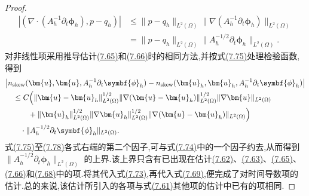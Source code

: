 \begin{proof}
\begin{equation}
\begin{aligned}
  |(\nabla\cdot(A_h^{-1}\partial_t\symbf{\phi}_h),p-q_h)|
  &\le \|p-q_h\|_{L^2(\Omega)}
       \|\nabla(A_h^{-1}\partial_t\symbf{\phi}_h)\|_{L^2(\Omega)}\\
  &=\|p-q_h\|_{L^2(\Omega)}
       \|A_h^{-1/2}\partial_t\symbf{\phi}_h\|_{L^2(\Omega)}.
\end{aligned}
\end{equation}
对非线性项采用推导估计\hyperref[eq:time-dependent-pressure-error-convection-bound-1]{(7.65)}和\hyperref[eq:time-dependent-pressure-error-convection-bound-2]{(7.66)}时的相同方法,并按式\hyperref[eq:time-dependent-pressure-error-time-derivative-projection-test]{(7.75)}处理检验函数,得到
\begin{equation}\label{eq:time-dependent-pressure-error-convection-test}
\begin{aligned}
  &\bigl|n_{\mathrm{skew}}(\bm{u},\bm{u},
       A_h^{-1}\partial_t\symbf{\phi}_h)
       -n_{\mathrm{skew}}(\bm{u}_h,\bm{u}_h,
       A_h^{-1}\partial_t\symbf{\phi}_h)\bigr|\\
  &\quad\le C\Bigl(
       \|\bm{u}-\bm{u}_h\|_{L^2(\Omega)}^{1/2}
       \|\nabla(\bm{u}-\bm{u}_h)\|_{L^2(\Omega)}^{1/2}
       \|\nabla\bm{u}\|_{L^2(\Omega)}\\
  &\qquad\quad+
       \|\bm{u}_h\|_{L^2(\Omega)}^{1/2}
       \|\nabla\bm{u}_h\|_{L^2(\Omega)}^{1/2}
       \|\nabla(\bm{u}-\bm{u}_h)\|_{L^2(\Omega)}
       \Bigr)\\
  &\qquad\cdot\|A_h^{-1/2}\partial_t\symbf{\phi}_h\|_{L^2(\Omega)}.
\end{aligned}
\end{equation}
式\hyperref[eq:time-dependent-pressure-error-time-derivative-projection-test]{(7.75)}至\hyperref[eq:time-dependent-pressure-error-convection-test]{(7.78)}各式右端的第二个因子,可与式\hyperref[eq:time-dependent-pressure-error-time-derivative-test]{(7.74)}中的一个因子约去,从而得到 $\|A_h^{-1/2}\partial_t\symbf{\phi}_h\|_{L^2(\Omega)}$ 的上界.该上界只含有已出现在估计\hyperref[eq:time-dependent-pressure-error-viscous-bound]{(7.62)}、\hyperref[eq:time-dependent-pressure-error-pressure-bound]{(7.63)}、\hyperref[eq:time-dependent-pressure-error-convection-bound-1]{(7.65)}、\hyperref[eq:time-dependent-pressure-error-convection-bound-2]{(7.66)}和\hyperref[eq:time-dependent-pressure-error-time-derivative-projection]{(7.68)}中的项.将其代入式\hyperref[eq:time-dependent-pressure-error-time-derivative-negative-norm]{(7.73)},再代入式\hyperref[eq:time-dependent-pressure-error-time-derivative-discrete]{(7.69)},便完成了对时间导数项的估计.总的来说,该估计所引入的各项与式\hyperref[eq:time-dependent-pressure-error-numerator]{(7.61)}其他项的估计中已有的项相同.


\end{proof}
